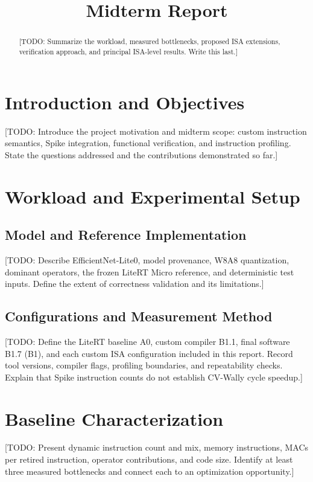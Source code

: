 \documentclass[10pt,a4paper,twocolumn]{article}
\title{\projecttitle\\\large Midterm Report}
\author{\reportauthors}
\newcommand{\todo}[1]{\textcolor{blue!60!black}{[TODO: #1]}}
\begin{document}
\maketitle

\begin{abstract}
\todo{Summarize the workload, measured bottlenecks, proposed ISA extensions,
verification approach, and principal ISA-level results. Write this last.}
\end{abstract}

\section{Introduction and Objectives}
\label{sec:introduction}
\todo{Introduce the project motivation and midterm scope: custom instruction
semantics, Spike integration, functional verification, and instruction profiling.
State the questions addressed and the contributions demonstrated so far.}

\section{Workload and Experimental Setup}
\label{sec:setup}
\subsection{Model and Reference Implementation}
\todo{Describe EfficientNet-Lite0, model provenance, W8A8 quantization, dominant
operators, the frozen LiteRT Micro reference, and deterministic test inputs.
Define the extent of correctness validation and its limitations.}

\subsection{Configurations and Measurement Method}
\todo{Define the LiteRT baseline A0, custom compiler B1.1, final software B1.7 (B1),
and each custom ISA configuration included in this report. Record tool versions,
compiler flags, profiling boundaries, and repeatability checks. Explain that
Spike instruction counts do not establish CV-Wally cycle speedup.}

\section{Baseline Characterization}
\label{sec:baseline}
\todo{Present dynamic instruction count and mix, memory instructions, MACs per
retired instruction, operator contributions, and code size. Identify at least
three measured bottlenecks and connect each to an optimization opportunity.}
\end{document}
